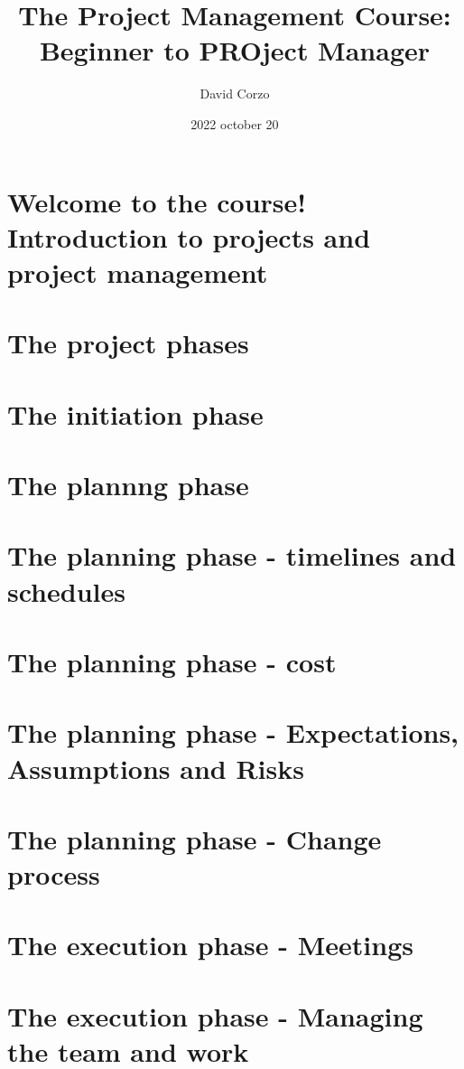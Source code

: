 \documentclass[openany]{book}
\title{The Project Management Course: Beginner to PROject Manager}
\date{2022 october 20}
\author{David Corzo}
\begin{document}
\maketitle
\tableofcontents

\chapter{Welcome to the course! Introduction to projects and project management}


\chapter{The project phases}


\chapter{The initiation phase}


\chapter{The plannng phase}


\chapter{The planning phase - timelines and schedules}


\chapter{The planning phase - cost}


\chapter{The planning phase - Expectations, Assumptions and Risks}


\chapter{The planning phase - Change process}


\chapter{The execution phase - Meetings}


\chapter{The execution phase - Managing the team and work}


\end{document}
